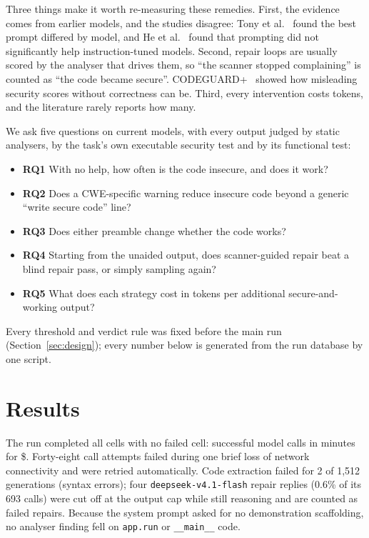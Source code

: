 \documentclass[10pt]{article}
\begin{document}
Three things make it worth re-measuring these remedies. First, the evidence comes from earlier models, and the
studies disagree: Tony et al.~\cite{tony2024prompting} found the best prompt differed by model, and He et
al.~\cite{he2024safecoder} found that prompting did not significantly help instruction-tuned models. Second, repair
loops are usually scored by the analyser that drives them, so ``the scanner stopped complaining'' is counted as
``the code became secure''. CODEGUARD+~\cite{fu2024codeguard} showed how misleading security scores without
correctness can be. Third, every intervention costs tokens, and the literature rarely reports how many.

We ask five questions on current models, with every output judged by static analysers, by the task's own
executable security test and by its functional test:
\begin{itemize}\itemsep1pt
\item \textbf{RQ1} With no help, how often is the code insecure, and does it work?
\item \textbf{RQ2} Does a CWE-specific warning reduce insecure code beyond a generic ``write secure code'' line?
\item \textbf{RQ3} Does either preamble change whether the code works?
\item \textbf{RQ4} Starting from the unaided output, does scanner-guided repair beat a blind repair pass, or simply
      sampling again?
\item \textbf{RQ5} What does each strategy cost in tokens per additional secure-and-working output?
\end{itemize}
Every threshold and verdict rule was fixed before the main run (Section~\ref{sec:design}); every number below is
generated from the run database by one script.




\section{Results}\label{sec:results}
The run completed all \NCells{} cells with no failed cell: \NCalls{} successful model calls in \RunMinutes{}
minutes for \$\TotalCost{}. Forty-eight call attempts failed during one brief loss of network connectivity and
were retried automatically. Code extraction failed for 2 of 1{,}512 generations (syntax errors); four
\texttt{deepseek-v4.1-flash} repair replies (0.6\% of its 693 calls) were cut off at the output cap while still
reasoning and are counted as failed repairs. Because the system prompt asked for no demonstration scaffolding, no
analyser finding fell on \texttt{app.run} or \texttt{\_\_main\_\_} code.
\end{document}
